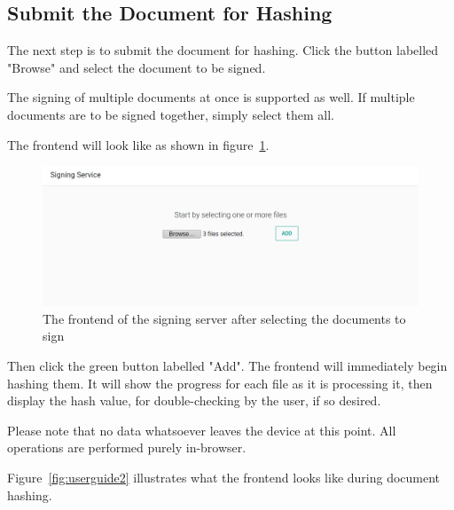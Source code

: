 \subsection{Submit the Document for Hashing}\label{subsec:submit-the-document-for-hashing}
The next step is to submit the document for hashing.
Click the button labelled "Browse" and select the document to be signed.

The signing of multiple documents at once is supported as well.
If multiple documents are to be signed together,
simply select them all.

The frontend will look like as shown in figure~\ref{fig:userguide1}.

\begin{figure}[H]
    \begin{center}
        \includegraphics[width=\linewidth]{images/userguide_sign_1.png}
    \end{center}
    \caption{The frontend of the signing server after selecting the documents to sign}
    \label{fig:userguide1}
\end{figure}

Then click the green button labelled "Add".
The frontend will immediately begin hashing them.
It will show the progress for each file as it is processing it,
then display the hash value,
for double-checking by the user,
if so desired.

Please note that no data whatsoever leaves the device at this point.
All operations are performed purely in-browser.

Figure~\ref{fig:userguide2} illustrates what the frontend looks like during document hashing.

